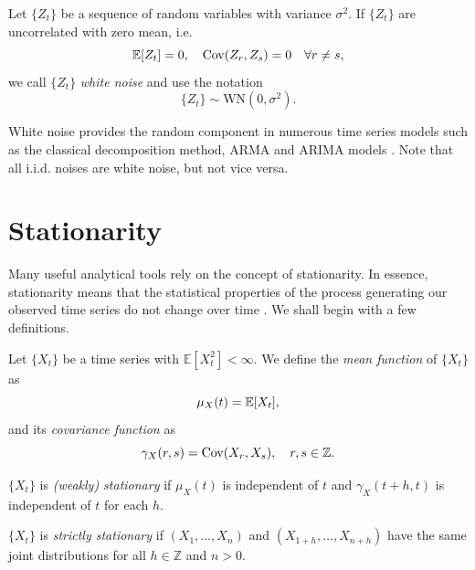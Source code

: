 \documentclass[a4paper, oneside]{discothesis}
\begin{document}
\begin{definition}
    Let $\{Z_t\}$ be a sequence of random variables with variance $\sigma^2$. If $\{Z_t\}$ are uncorrelated with zero mean, i.e.
    \begin{equation*}
        \operatorname{\mathbb{E}}[Z_t] = 0, \quad \operatorname{\mathrm{Cov}}(Z_r, Z_s) = 0 \quad \forall r \neq s,
    \end{equation*}
    we call $\{Z_t\}$ \textit{white noise} and use the notation
    \begin{equation*}
        \{Z_t\} \sim \mathrm{WN}(0, \sigma^2).
    \end{equation*}
\end{definition}
White noise provides the random component in numerous time series models such as the classical decomposition method, ARMA and ARIMA models \cite{wn_python}. Note that all i.i.d. noises are white noise, but not vice versa.

\section{Stationarity}

Many useful analytical tools rely on the concept of stationarity. In essence, stationarity means that the statistical properties of the process generating our observed time series do not change over time  \cite{kdnugget}. We shall begin with a few definitions.

\begin{definition}
    Let $\{X_t\}$ be a time series with $\mathbb{E}[X_t^2] < \infty$. We define the \textit{mean function} of $\{X_t\}$ as
    \begin{equation}
        \mu_X(t) = \operatorname{\mathbb{E}}[X_t],
    \end{equation}
    and its \textit{covariance function} as
    \begin{equation}
        \gamma_X(r, s) = \operatorname{\mathrm{Cov}}(X_r, X_s),\quad r, s \in \mathbb{Z}.
    \end{equation}
\end{definition}
\newpage
\begin{definition}
    $\{X_t\}$ is \textit{(weakly) stationary} if $\mu_X(t)$ is independent of $t$ and $\gamma_X(t+h, t)$ is independent of $t$ for each $h$.
\end{definition}

\begin{definition}
    $\{X_t\}$ is \textit{strictly stationary} if $(X_1, \dots, X_n)$ and $(X_{1+h}, \dots, X_{n+h})$ have the same joint distributions for all $h \in \mathbb{Z}$ and $n > 0$.
\end{definition}
\end{document}
